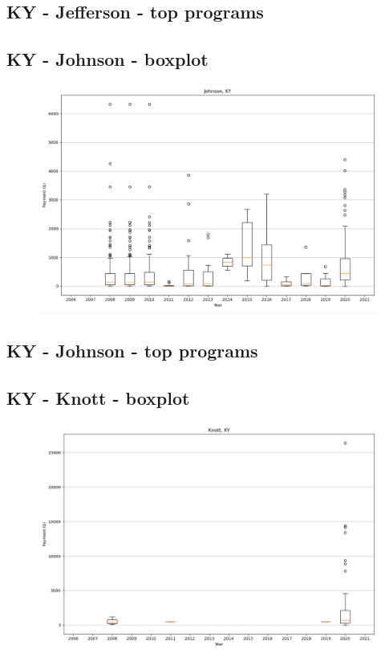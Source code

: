 \subsection*{KY - Jefferson - top programs}

\newpage
\subsection*{KY - Johnson - boxplot}
\begin{figure}[h]
\centering
\includegraphics[width=7in]{../output/boxplots/counties/Johnson-KY_boxplot.png}
\end{figure}


\subsection*{KY - Johnson - top programs}

\newpage
\subsection*{KY - Knott - boxplot}
\begin{figure}[h]
\centering
\includegraphics[width=7in]{../output/boxplots/counties/Knott-KY_boxplot.png}
\end{figure}


